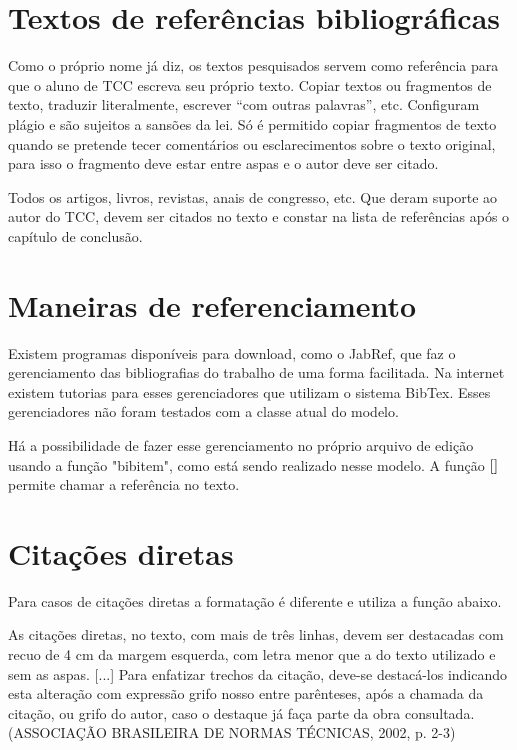 \documentclass[
        oneside,      %
        english,			
        brazil			 
        ]{configcefetmglpd}
\begin{document}
\section{Textos de referências bibliográficas}
Como o próprio nome já diz, os textos pesquisados servem como referência para que o aluno de TCC escreva seu próprio texto. Copiar textos ou fragmentos de texto, traduzir literalmente, escrever “com outras palavras”, etc. Configuram plágio e são sujeitos a sansões da lei. Só é permitido copiar fragmentos de texto quando se pretende tecer comentários ou esclarecimentos sobre o texto original, para isso o fragmento deve estar entre aspas e o autor deve ser citado.

Todos os artigos, livros, revistas, anais de congresso, etc. Que deram suporte ao autor do TCC, devem ser citados no texto e constar na lista de referências após o capítulo de conclusão.

\section{Maneiras de referenciamento}
Existem programas disponíveis para download, como o JabRef, que faz o gerenciamento das bibliografias do trabalho de uma forma facilitada. Na internet existem tutorias para esses gerenciadores que utilizam o sistema BibTex. Esses gerenciadores não foram testados com a classe atual do modelo.

Há a possibilidade de fazer esse gerenciamento no próprio arquivo de edição usando a função "bibitem", como está sendo realizado nesse modelo. A função $\cite{}$ permite chamar a referência no texto.

\section{Citações diretas}
Para casos de citações diretas a formatação é diferente e utiliza a função abaixo.

\begin{citacao}
	As cita\c{c}\~oes diretas, no texto, com mais de tr\^es linhas, devem ser destacadas 
	com recuo de 4 cm da margem esquerda, com letra menor que a do texto utilizado 
	e sem as aspas. [...] Para enfatizar trechos da cita\c{c}\~ao, deve-se destac\'a-los indicando esta 
	altera\c{c}\~ao com express\~ao grifo nosso entre par\^enteses, ap\'os a chamada da cita\c{c}\~ao, ou grifo 
	do autor, caso o destaque j\'a fa\c{c}a parte da obra consultada. (ASSOCIA\c{C}\~AO BRASILEIRA DE NORMAS 
	T\'ECNICAS, 2002, p. 2-3)
\end{citacao}
\end{document}
